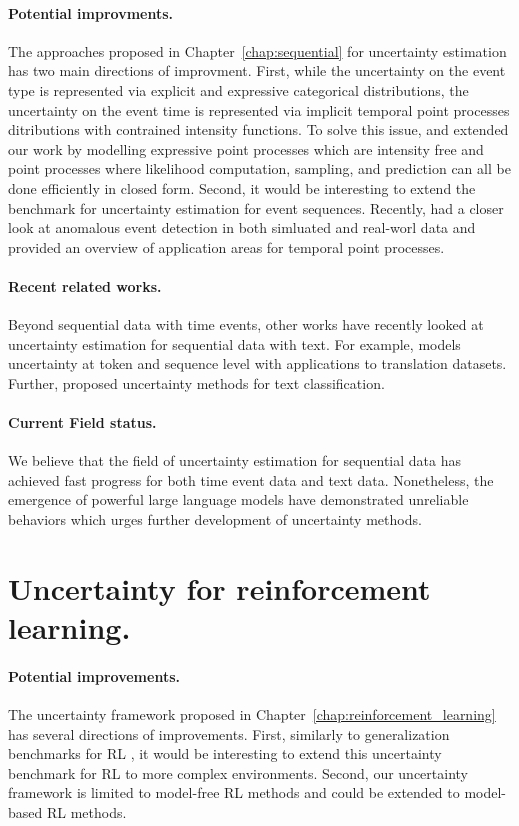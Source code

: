 \paragraph{Potential improvments.} The approaches proposed in Chapter~\ref{chap:sequential} for uncertainty estimation has two main directions of improvment. First, while the uncertainty on the event type is represented via explicit and expressive categorical distributions, the uncertainty on the event time is represented via implicit temporal point processes ditributions with contrained intensity functions. To solve this issue, \cite{shchur2020intensity} and \cite{shchur2020fast} extended our work by modelling expressive point processes which are intensity free and point processes where likelihood computation, sampling, and prediction can all be done efficiently in closed form. Second, it would be interesting to extend the benchmark for uncertainty estimation for event sequences. Recently, \cite{shchur2021detecting} had a closer look at anomalous event detection in both simluated and real-worl data and \cite{shchur2021review} provided an overview of application areas for temporal point processes. 

\paragraph{Recent related works.} Beyond sequential data with time events, other works have recently looked at uncertainty estimation for sequential data with text. For example, \cite{malinin2021uncertainty} models uncertainty at token and sequence level with applications to translation datasets. Further, \cite{he2020toward, hu2021uncertainty} proposed uncertainty methods for text classification.

\paragraph{Current Field status.} We believe that the field of uncertainty estimation for sequential data has achieved fast progress for both time event data and text data. Nonetheless, the emergence of powerful large language models have demonstrated unreliable behaviors which urges further development of uncertainty methods. 

\section{Uncertainty for reinforcement learning.}

\paragraph{Potential improvements.} The uncertainty framework proposed in Chapter~\ref{chap:reinforcement_learning} has several directions of improvements. First, similarly to generalization benchmarks for RL \cite{generalization-rl-survey, assessing-generalization-rl, qyantifying-generalization-rl, procgen}, it would be interesting to extend this uncertainty benchmark for RL to more complex environments. Second, our uncertainty framework is limited to model-free RL methods and could be extended to model-based RL methods. 

